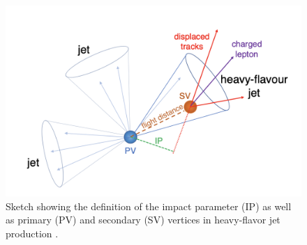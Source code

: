 \begin{figure}[hbt]
    \centering
    \includegraphics[width=0.5\linewidth]{Images/3.CMS/impact parameter.png}
    \caption{Sketch showing the definition of the impact parameter (IP) as well as primary (PV) and secondary (SV) vertices in heavy-flavor jet production \cite{IP}. }
    \label{fig: IP}
\end{figure}



